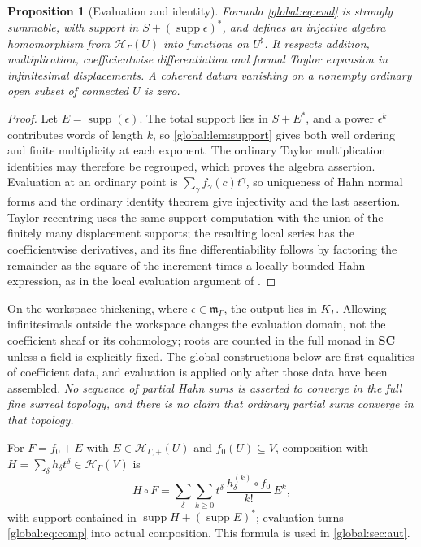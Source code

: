 \documentclass[11pt,letterpaper]{article}
\newtheorem{proposition}[proposition]{Proposition}
\theoremstyle{definition}
\theoremstyle{remark}
\newcommand{\SC}{\mathbf{SC}}
\newcommand{\HH}{\mathscr H_\Gamma}
\newcommand{\HP}{\mathscr H_{\Gamma,+}}
\newcommand{\KK}{K_\Gamma}
\newcommand{\mK}{\mathfrak m_\Gamma}
\newcommand{\sh}{^{\sharp}}
\newcommand{\supp}{\operatorname{supp}}
\numberwithin{equation}{section}
\begin{document}
\begin{proposition}[Evaluation and identity]\label{global:prop:evaluation}
Formula \eqref{global:eq:eval} is strongly summable, with support in $S+(\supp\epsilon)^*$, and defines an injective algebra homomorphism from $\HH(U)$ into functions on $U\sh$. It respects addition, multiplication, coefficientwise differentiation and formal Taylor expansion in infinitesimal displacements. A coherent datum vanishing on a nonempty ordinary open subset of connected $U$ is zero.
\end{proposition}

\begin{proof}
Let $E=\supp(\epsilon)$. The total support lies in $S+E^*$, and a power $\epsilon^k$ contributes words of length $k$, so \cref{global:lem:support} gives both well ordering and finite multiplicity at each exponent. The ordinary Taylor multiplication identities may therefore be regrouped, which proves the algebra assertion. Evaluation at an ordinary point is $\sum_\gamma f_\gamma(c)t^\gamma$, so uniqueness of Hahn normal forms and the ordinary identity theorem give injectivity and the last assertion. Taylor recentring uses the same support computation with the union of the finitely many displacement supports; the resulting local series has the coefficientwise derivatives, and its fine differentiability follows by factoring the remainder as the square of the increment times a locally bounded Hahn expression, as in the local evaluation argument of \cite[\S5]{Source}.
\end{proof}

On the workspace thickening, where $\epsilon\in\mK$, the output lies in $\KK$. Allowing infinitesimals outside the workspace changes the evaluation domain, not the coefficient sheaf or its cohomology; roots are counted in the full monad in $\SC$ unless a field is explicitly fixed. The global constructions below are first equalities of coefficient data, and evaluation is applied only after those data have been assembled. \emph{No sequence of partial Hahn sums is asserted to converge in the full fine surreal topology, and there is no claim that ordinary partial sums converge in that topology.}

For $F=f_0+E$ with $E\in\HP(U)$ and $f_0(U)\subseteq V$, composition with $H=\sum_\delta h_\delta t^\delta\in\HH(V)$ is
\begin{equation}\label{global:eq:comp}
  H\circ F=\sum_{\delta}\sum_{k\ge0}t^\delta\,
  \frac{h_\delta^{(k)}\circ f_0}{k!}\,E^k,
\end{equation}
with support contained in $\supp H+(\supp E)^*$; evaluation turns \eqref{global:eq:comp} into actual composition. This formula is used in \cref{global:sec:aut}.
\end{document}
